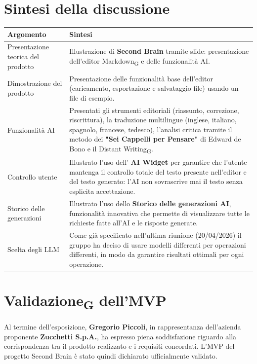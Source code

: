 \documentclass[a4paper,12pt]{article}
\newcommand{\gls}[1]{#1\textsubscript{G}}
\begin{document}
\section*{ Sintesi della discussione}

\begin{longtable}{|p{}|p{}|}
\hline
\textbf{Argomento} & \textbf{Sintesi} \\ \hline
    Presentazione teorica del prodotto & Illustrazione di \textbf{Second Brain} tramite slide: presentazione dell'editor \gls{Markdown} e delle funzionalità AI. \\
    \hline
    Dimostrazione del prodotto & Presentazione delle funzionalità base dell'editor (caricamento, esportazione e salvataggio file) usando un file di esempio.\\
    \hline
    Funzionalità AI & Presentati gli strumenti editoriali (riassunto, correzione, riscrittura), la traduzione multilingue (inglese, italiano, spagnolo, francese, tedesco), l'analisi critica tramite il metodo dei \textbf{"Sei Cappelli per Pensare"} di Edward de Bono e il \gls{Distant Writing}. \\ \hline
    Controllo utente & Illustrato l'uso dell' \textbf{AI Widget} per garantire che l'utente mantenga il controllo totale del testo presente nell'editor e del testo generato: l'AI non sovrascrive mai il testo senza esplicita accettazione. \\
    \hline
    Storico delle generazioni & Illustrato l'uso dello \textbf{Storico delle generazioni AI}, funzionalità innovativa che permette di visualizzare tutte le richieste fatte all'AI e le risposte generate. \\
    \hline
    Scelta degli LLM & Come già specificato nell'ultima riunione (20/04/2026) il gruppo ha deciso di usare modelli differenti per operazioni differenti, in modo da garantire risultati ottimali per ogni operazione.\\
    \hline
\end{longtable}

\section*{\gls{Validazione} dell'MVP}
Al termine dell'esposizione, \textbf{Gregorio Piccoli}, in rappresentanza dell'azienda proponente \textbf{Zucchetti S.p.A.}, ha espresso piena soddisfazione riguardo alla corrispondenza tra il prodotto realizzato e i requisiti concordati. L'MVP del progetto Second Brain è stato quindi dichiarato ufficialmente validato.
\end{document}
